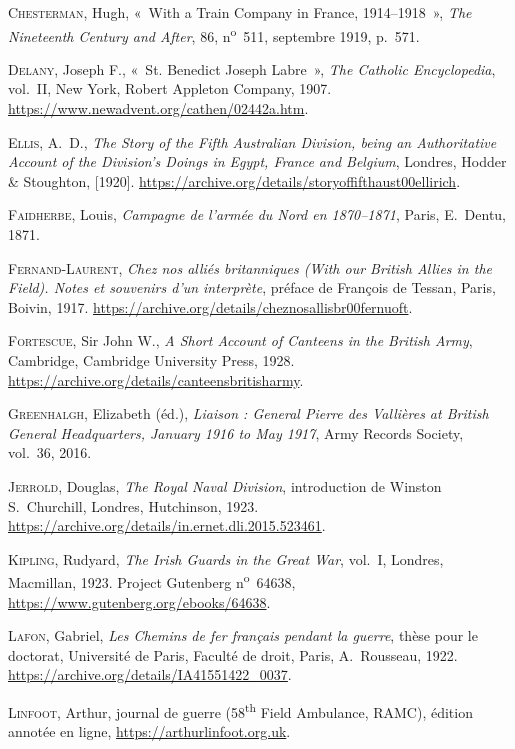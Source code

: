 \begin{biblist}
\item \textsc{Chesterman}, Hugh, «~With a Train Company in France, 1914--1918~», \textit{The Nineteenth Century and After}, 86, n\textsuperscript{o}~511, septembre 1919, p.~571.
\item \textsc{Delany}, Joseph F., «~St. Benedict Joseph Labre~», \textit{The Catholic Encyclopedia}, vol.~II, New York, Robert Appleton Company, 1907. \url{https://www.newadvent.org/cathen/02442a.htm}.
\item \textsc{Ellis}, A.~D., \textit{The Story of the Fifth Australian Division, being an Authoritative Account of the Division's Doings in Egypt, France and Belgium}, Londres, Hodder \& Stoughton, [1920]. \url{https://archive.org/details/storyoffifthaust00ellirich}.
\item \textsc{Faidherbe}, Louis, \textit{Campagne de l'armée du Nord en 1870--1871}, Paris, E.~Dentu, 1871.
\item \textsc{Fernand-Laurent}, \textit{Chez nos alliés britanniques (With our British Allies in the Field). Notes et souvenirs d'un interprète}, préface de François de Tessan, Paris, Boivin, 1917. \url{https://archive.org/details/cheznosallisbr00fernuoft}.
\item \textsc{Fortescue}, Sir John W., \textit{A Short Account of Canteens in the British Army}, Cambridge, Cambridge University Press, 1928. \url{https://archive.org/details/canteensbritisharmy}.
\item \textsc{Greenhalgh}, Elizabeth (éd.), \textit{Liaison : General Pierre des Vallières at British General Headquarters, January 1916 to May 1917}, Army Records Society, vol.~36, 2016.
\item \textsc{Jerrold}, Douglas, \textit{The Royal Naval Division}, introduction de Winston S.~Churchill, Londres, Hutchinson, 1923. \url{https://archive.org/details/in.ernet.dli.2015.523461}.
\item \textsc{Kipling}, Rudyard, \textit{The Irish Guards in the Great War}, vol.~I, Londres, Macmillan, 1923. Project Gutenberg n\textsuperscript{o}~64638, \url{https://www.gutenberg.org/ebooks/64638}.
\item \textsc{Lafon}, Gabriel, \textit{Les Chemins de fer français pendant la guerre}, thèse pour le doctorat, Université de Paris, Faculté de droit, Paris, A.~Rousseau, 1922. \url{https://archive.org/details/IA41551422_0037}.
\item \textsc{Linfoot}, Arthur, journal de guerre (58\textsuperscript{th} Field Ambulance, RAMC), édition annotée en ligne, \url{https://arthurlinfoot.org.uk}.

\end{biblist}
